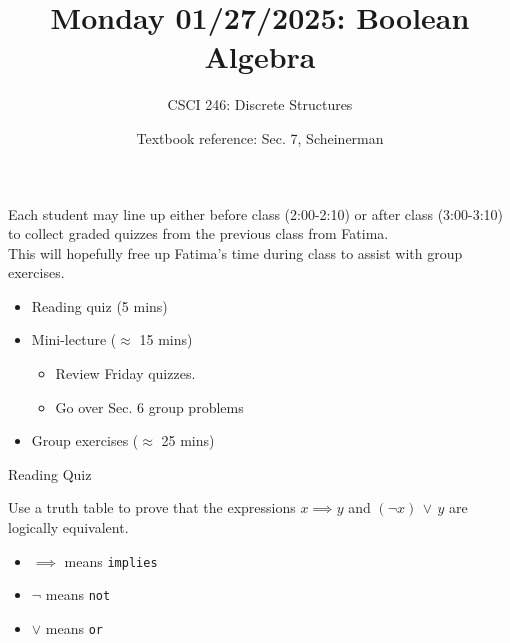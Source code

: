 \documentclass[10pt]{beamer}
\begin{document}






\title{Monday 01/27/2025: Boolean Algebra}
\author{CSCI 246: Discrete Structures}
\date{Textbook reference: Sec. 7, Scheinerman}

\begin{frame}
    \titlepage 
\end{frame}


\begin{frame}

\begin{myredbox}[title=New way to get quizzes back!]
Each student may line up either before class (2:00-2:10) or after class (3:00-3:10) to collect graded quizzes from the previous class from Fatima. \\
\vfill 
This will hopefully free up Fatima's time during class to assist with group exercises.
\end{myredbox}
\vfill \vfill 

\begin{myyellowbox}[title=Today's Agenda]
\begin{itemize}
	\item Reading quiz  (5 mins)
	\item Mini-lecture ($\approx$ 15 mins)
	\begin{itemize}
	\item Review Friday quizzes. 
	\item Go over Sec. 6 group problems
	\end{itemize}
	\item Group exercises ($\approx$ 25 mins)	
\end{itemize}

\end{myyellowbox}


\end{frame}



\begin{frame}{Reading Quiz}
 \begin{mygreenbox}[title=Reading Quiz (Sec. 7 - Boolean Algebra)]
Use a truth table to prove that the expressions $x \implies y$ and $(\lnot x) \, \lor \, y$ are logically equivalent.
\vfill 
\end{mygreenbox}
\vfill \vfill 

\begin{myredbox}[title=Notation reminder]
\begin{itemize}
\item $\implies$ means \texttt{implies}
\item $\lnot$ means \texttt{not}
\item $\lor$ means \texttt{or} 	
\end{itemize}
\end{myredbox}
\end{frame}
\end{document}
